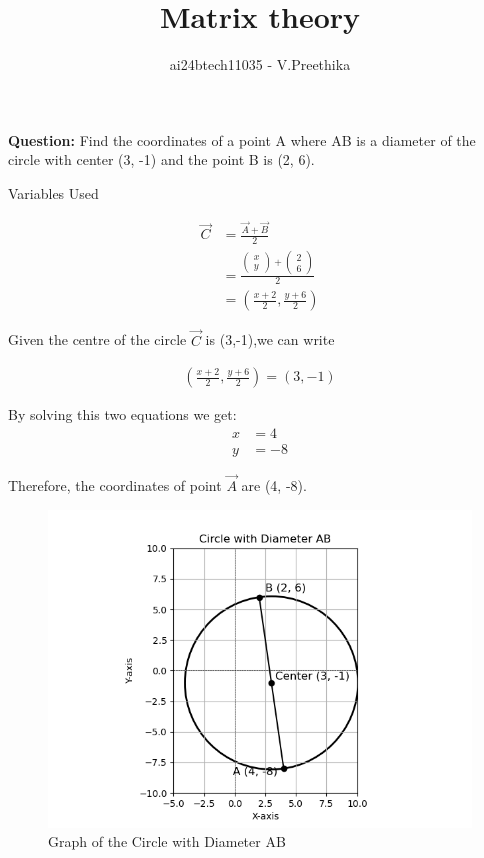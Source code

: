 \documentclass[journal]{IEEEtran}
\begin{document}

\vspace{3cm}

\title{Matrix theory}
\author{ai24btech11035 - V.Preethika}
\maketitle
\bigskip
\newcommand{\createMat}[2]{\begin{pmatrix} #1 \\ #2 \end{pmatrix}}
\renewcommand{\thefigure}{\theenumi}
\renewcommand{\thetable}{\theenumi}

\textbf{Question:} Find the coordinates of a point A where AB is a diameter of the circle with center (3, -1) and the point B is (2, 6).\\
	    
\begin{table}[h!]
	\centering
  
	\caption{Variables Used}
	\label{tab1.5.16}
\end{table}
    \solution
	\begin{align}
    \vec{C} &= \frac{\vec{A}+\vec{B}}{2} \\
		&= \frac{\createMat{x}{y} + \createMat{2}{6}}{2} \\
             &= \left(\frac{x+2}{2}, \frac{y+6}{2}\right)
	\end{align}
	  
    
		Given the centre of the circle $\vec{C}$ is (3,-1),we can write
    
		\begin{align}
    \left( \frac{x + 2}{2}, \frac{y + 6}{2} \right) = (3, -1)
		\end{align}
    
    By solving this two equations we get:
    \begin{align}
	    x &= 4 \\
	    y &= -8
    \end{align}

    
    Therefore, the coordinates of point $\vec{A}$ are (4, -8).
    

\begin{figure}[ht]
   \centering
   \includegraphics[width=0.7\linewidth]{Figs/fig_1.png}
   \caption{Graph of the Circle with Diameter AB}
   \label{q16}
\end{figure}
\end{document}
